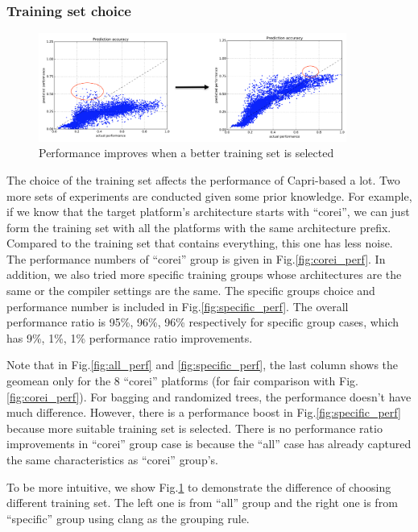     \subsubsection{Training set choice}
    \label{sec:training_set}
    \begin{figure}[tbhp]
      \centering
      \includegraphics[width=0.9\textwidth]{images/ypei_perf_change.png}
      \caption{Performance improves when a better training set is selected}
      \label{fig:ypei_perf_change}
    \end{figure}
    The choice of the training set affects the performance of Capri-based \atl
    a lot. Two more sets of experiments are conducted given some prior
    knowledge. For example, if we know that the target platform's architecture
    starts with ``corei'', we can just form the training set with all the
    platforms with the same architecture prefix. Compared to the training set
    that contains everything, this one has less noise. The performance numbers
    of ``corei'' group is given in Fig.\ref{fig:corei_perf}. In addition, we
    also tried more specific training groups whose architectures are the same or
    the compiler settings are the same. The specific groups choice and
    performance number is included in Fig.\ref{fig:specific_perf}. The overall
    performance ratio is 95\%, 96\%, 96\% respectively for specific group cases,
    which has 9\%, 1\%, 1\% performance ratio improvements.

    Note that in Fig.\ref{fig:all_perf} and \ref{fig:specific_perf}, the last
    column shows the geomean only for the 8 ``corei'' platforms (for fair
    comparison with Fig.\ref{fig:corei_perf}). For bagging and randomized
    trees, the performance doesn't have much difference. However, there is a
    performance boost in Fig.\ref{fig:specific_perf} because more suitable
    training set is selected. There is no performance ratio improvements in
    ``corei'' group case is because the ``all'' case has already captured
    the same characteristics as ``corei'' group's.

    To be more intuitive, we show Fig.\ref{fig:ypei_perf_change} to demonstrate
    the difference of choosing different training set. The left one is from
    ``all'' group and the right one is from ``specific'' group using clang as
    the grouping rule.

